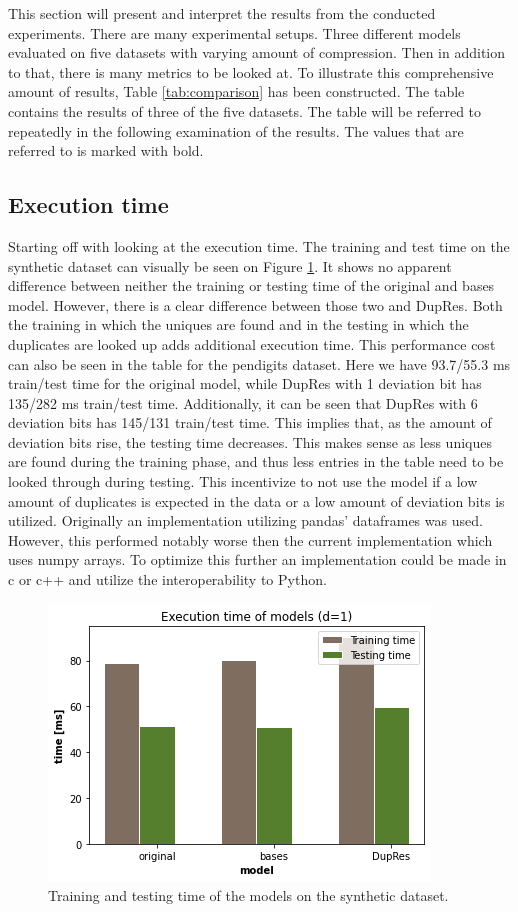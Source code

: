This section will present and interpret the results from the conducted experiments. There are many experimental setups. Three different models evaluated on five datasets with varying amount of compression. Then in addition to that, there is many metrics to be looked at. To illustrate this comprehensive amount of results, Table \ref{tab:comparison} has been constructed. The table contains the results of three of the five datasets. The table will be referred to repeatedly in the following examination of the results. The values that are referred to is marked with bold.

\subsection{Execution time}
Starting off with looking at the execution time. The training and test time on the synthetic dataset can visually be seen on Figure \ref{fig:performance_time}. It shows no apparent difference between neither the training or testing time of the original and bases model. However, there is a clear difference between those two and DupRes. Both the training in which the uniques are found and in the testing in which the duplicates are looked up adds additional execution time. This performance cost can also be seen in the table for the pendigits dataset. Here we have 93.7/55.3 ms train/test time for the original model, while DupRes with 1 deviation bit has 135/282 ms train/test time. Additionally, it can be seen that DupRes with 6 deviation bits has 145/131 train/test time. This implies that, as the amount of deviation bits rise, the testing time decreases. This makes sense as less uniques are found during the training phase, and thus less entries in the table need to be looked through during testing. This incentivize to not use the model if a low amount of duplicates is expected in the data or a low amount of deviation bits is utilized. Originally an implementation utilizing pandas'\cite{pandas} dataframes was used. However, this performed notably worse then the current implementation which uses numpy\cite{numpy} arrays. To optimize this further an implementation could be made in c or c++ and utilize the interoperability to Python.

\begin{figure}
  \centering
  \includegraphics[width=0.8\linewidth]{images/performance_time.png}
  \caption{Training and testing time of the models on the synthetic dataset.}
  \label{fig:performance_time}
\end{figure}

